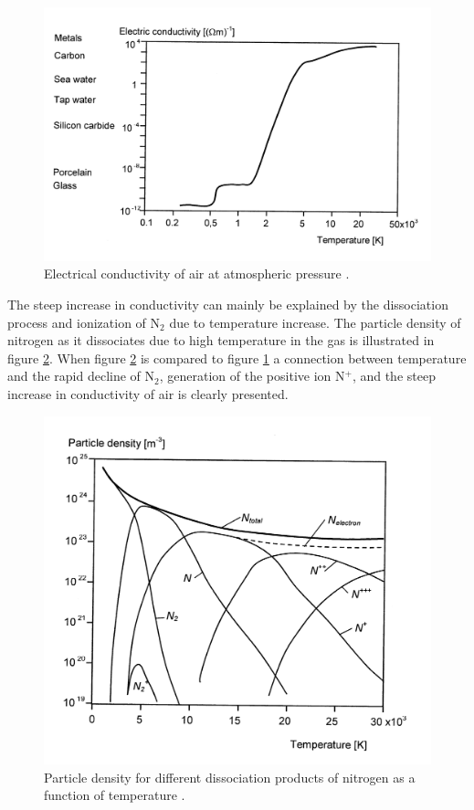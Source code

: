 \documentclass[10pt,a4paper]{article}
\begin{document}
\begin{figure}[H]
\centering
\includegraphics[scale=0.8]{Bilder/Theory/airConduct.png}
\caption{Electrical conductivity of air at atmospheric pressure \cite{bib:HVEbreak}.} \label{fig:condAir}
\end{figure}

The steep increase in conductivity can mainly be explained by the dissociation process and ionization of N$_2$ due to temperature increase. The particle density of nitrogen as it dissociates due to high temperature in the gas is illustrated in figure \ref{fig:Ndensi}. When figure \ref{fig:Ndensi} is compared to figure \ref{fig:condAir} a connection between temperature and the rapid decline of N$_2$, generation of the positive ion N$^+$, and the steep increase in conductivity of air is clearly presented.

\begin{figure}[H]
\centering
\includegraphics[scale=0.8]{Bilder/Theory/particleDensNit.png}
\caption{Particle density for different dissociation products of nitrogen as a function of temperature \cite{bib:HVEbreak}.} \label{fig:Ndensi}
\end{figure}
\end{document}
